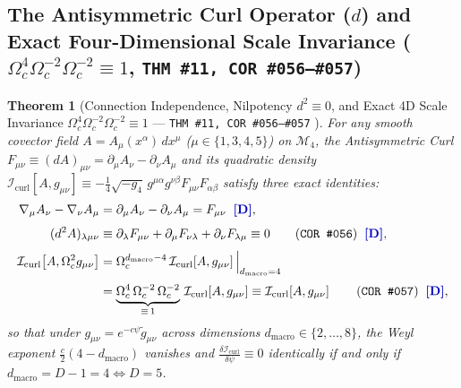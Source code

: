 \documentclass[11pt,a4paper]{article}
\newcommand{\catD}{\text{\textbf{\textcolor{blue!75!black}{[D]}}}}
\theoremstyle{definition}
\theoremstyle{plain}
\newtheorem{theorem}[axiom]{Theorem}
\theoremstyle{remark}
\begin{document}
\subsection{\texorpdfstring{The Antisymmetric Curl Operator ($d$) and Exact Four-Dimensional Scale Invariance ($\Omega_c^4 \Omega_c^{-2} \Omega_c^{-2} \equiv 1$, \texttt{THM~\#11, COR~\#056--\#057})}{The Antisymmetric Curl Operator and Exact Four-Dimensional Scale Invariance}}

\begin{theorem}[Connection Independence, Nilpotency $d^2 \equiv 0$, and Exact 4D Scale Invariance $\Omega_c^4 \Omega_c^{-2} \Omega_c^{-2} \equiv 1$ --- \texttt{THM~\#11, COR~\#056--\#057} \catD]\label{thm:c2_curl_invariance}\label{thm:c2_conformal_maxwell}
For any smooth covector field $A = A_\mu(x^\alpha)\,dx^\mu$ ($\mu \in \{1,3,4,5\}$) on $\mathcal{M}_4$, the Antisymmetric Curl $F_{\mu\nu} \equiv (dA)_{\mu\nu} = \partial_\mu A_\nu - \partial_\nu A_\mu$ and its quadratic density $\mathcal{I}_{\mathrm{curl}}[A, g_{\mu\nu}] \equiv -\frac{1}{4}\sqrt{-g_4}\,g^{\mu\alpha}g^{\nu\beta}F_{\mu\nu}F_{\alpha\beta}$ satisfy three exact identities:
\begin{align}
\nabla_\mu A_\nu - \nabla_\nu A_\mu &= \partial_\mu A_\nu - \partial_\nu A_\mu = F_{\mu\nu} \;\;\catD, \label{eq:c2_curl_connection_indep} \\[3pt]
(d^2 A)_{\lambda\mu\nu} &\equiv \partial_\lambda F_{\mu\nu} + \partial_\mu F_{\nu\lambda} + \partial_\nu F_{\lambda\mu} \equiv 0 \qquad \textnormal{(\texttt{COR~\#056})} \;\;\catD, \label{eq:c2_bianchi_nilpotent} \\[3pt]
\mathcal{I}_{\mathrm{curl}}\!\left[A, \Omega_c^2 g_{\mu\nu}\right] &= \Omega_c^{d_{\mathrm{macro}} - 4}\,\mathcal{I}_{\mathrm{curl}}\!\left[A, g_{\mu\nu}\right]\Big|_{d_{\mathrm{macro}} = 4} \nonumber \\[3pt]
&= \underbrace{\Omega_c^4\,\Omega_c^{-2}\,\Omega_c^{-2}}_{\equiv\, 1}\,\mathcal{I}_{\mathrm{curl}}\!\left[A, g_{\mu\nu}\right] \equiv \mathcal{I}_{\mathrm{curl}}\!\left[A, g_{\mu\nu}\right] \qquad \textnormal{(\texttt{COR~\#057})} \;\;\catD, \label{eq:c2_weyl_invariance}
\end{align}
so that under $g_{\mu\nu} = e^{-c\psi}\tilde{g}_{\mu\nu}$ across dimensions $d_{\mathrm{macro}} \in \{2,\dots,8\}$, the Weyl exponent $\frac{c}{2}(4 - d_{\mathrm{macro}})$ vanishes and $\frac{\delta\mathcal{I}_{\mathrm{curl}}}{\delta\psi} \equiv 0$ identically if and only if $d_{\mathrm{macro}} = D - 1 = 4 \iff D = 5$.
\end{theorem}
\end{document}
